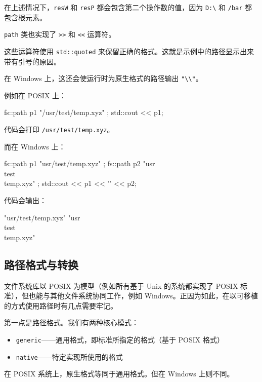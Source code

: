 在上述情况下，\texttt{resW} 和 \texttt{resP} 都会包含第二个操作数的值，因为 \texttt{D:\textbackslash} 和 \texttt{/bar} 都包含根元素。


\texttt{path} 类也实现了 \texttt{>>} 和 \texttt{<<} 运算符。

这些运算符使用 \texttt{std::quoted} 来保留正确的格式。这就是示例中的路径显示出来带有引号的原因。

在 Windows 上，这还会使运行时为原生格式的路径输出 \texttt{"\textbackslash\textbackslash"}。

例如在 POSIX 上：

\begin{codebox}[cpp]
fs::path p1 { "/usr/test/temp.xyz" };
std::cout << p1;
\end{codebox}

代码会打印 \texttt{/usr/test/temp.xyz}。

而在 Windows 上：

\begin{codebox}[cpp]
fs::path p1{ "usr/test/temp.xyz" };
fs::path p2{ "usr\\test\\temp.xyz" };
std::cout << p1 << '\n' << p2;
\end{codebox}

代码会输出：

\begin{codebox}[cpp]
"usr/test/temp.xyz"
"usr\\test\\temp.xyz"
\end{codebox}

\subsection{路径格式与转换}

文件系统库以 POSIX 为模型（例如所有基于 Unix 的系统都实现了 POSIX 标准），但也能与其他文件系统协同工作，例如 Windows。正因为如此，在以可移植的方式使用路径时有几点需要牢记。

第一点是路径格式。我们有两种核心模式：

\begin{itemize}
\item \texttt{generic}——通用格式，即标准所指定的格式（基于 POSIX 格式）
\item \texttt{native}——特定实现所使用的格式
\end{itemize}

在 POSIX 系统上，原生格式等同于通用格式。但在 Windows 上则不同。

